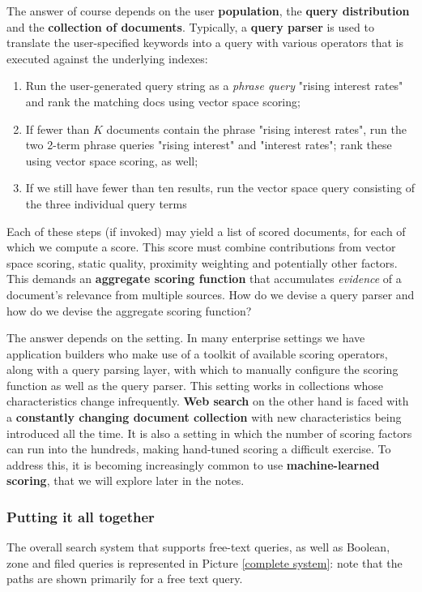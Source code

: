 The answer of course depends on the user \textbf{population}, the \textbf{query distribution} and the \textbf{collection of documents}. Typically, a \textbf{query parser} is used to translate the user-specified keywords into a query with various operators that is executed against the underlying indexes:

\begin{enumerate}
    \item Run the user-generated query string as a \textit{phrase query} "rising interest rates" and rank the matching docs using vector space scoring;
    \item If fewer than $K$ documents contain the phrase "rising interest rates", run the two 2-term phrase queries "rising interest" and "interest rates"; rank these using vector space scoring, as well;
    \item If we still have fewer than ten results, run the vector space query consisting of the three individual query terms
\end{enumerate}

Each of these steps (if invoked) may yield a list of scored documents, for each of which we compute a score. This score must combine contributions from vector space scoring, static quality, proximity weighting and potentially other factors. This demands an \textbf{aggregate scoring function} that accumulates \textit{evidence} of a document’s relevance from multiple sources. How do we devise a query parser and how do we devise the aggregate scoring function? 

The answer depends on the setting. In many enterprise settings we have application builders who make use of a toolkit of available scoring operators, along with a query parsing layer, with which to manually configure the scoring function as well as the query parser. This setting works in collections whose characteristics change infrequently. \textbf{Web search} on the other hand is faced with a \textbf{constantly changing document collection} with new characteristics being introduced all the time. It is also a setting in which the number of scoring factors can run into the hundreds, making hand-tuned scoring a difficult exercise. To address this, it is becoming increasingly common to use \textbf{machine-learned scoring}, that we will explore later in the notes.

\subsubsection{Putting it all together}
The overall search system that supports free-text queries, as well as Boolean, zone and filed queries is represented in Picture \ref{complete system}: note that the paths are shown primarily for a free text query.

